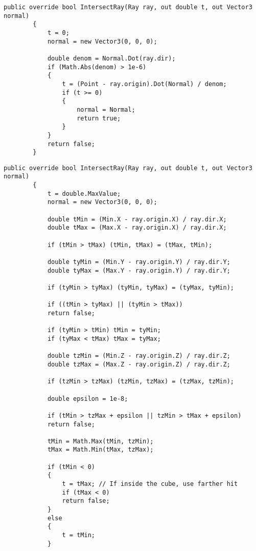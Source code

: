 \begin{center}
	\begin{lstlisting}[label={lst:WallIntersection}, captionpos={b}, caption={Алгоритм поиска точки пересечения луча с плоскостью (стеной)}]
		public override bool IntersectRay(Ray ray, out double t, out Vector3 normal)
		{
			t = 0;
			normal = new Vector3(0, 0, 0);
			
			double denom = Normal.Dot(ray.dir);
			if (Math.Abs(denom) > 1e-6)
			{
				t = (Point - ray.origin).Dot(Normal) / denom;
				if (t >= 0)
				{
					normal = Normal;
					return true;
				}
			}
			return false;
		}
	\end{lstlisting}
\end{center}

\begin{center}
	\begin{lstlisting}[label={lst:WallIntersection}, captionpos={b}, caption={Алгоритм поиска точки пересечения луча с кубом}]
		public override bool IntersectRay(Ray ray, out double t, out Vector3 normal)
		{
			t = double.MaxValue;
			normal = new Vector3(0, 0, 0);
			
			double tMin = (Min.X - ray.origin.X) / ray.dir.X;
			double tMax = (Max.X - ray.origin.X) / ray.dir.X;
			
			if (tMin > tMax) (tMin, tMax) = (tMax, tMin);
			
			double tyMin = (Min.Y - ray.origin.Y) / ray.dir.Y;
			double tyMax = (Max.Y - ray.origin.Y) / ray.dir.Y;
			
			if (tyMin > tyMax) (tyMin, tyMax) = (tyMax, tyMin);
			
			if ((tMin > tyMax) || (tyMin > tMax))
			return false;
			
			if (tyMin > tMin) tMin = tyMin;
			if (tyMax < tMax) tMax = tyMax;
			
			double tzMin = (Min.Z - ray.origin.Z) / ray.dir.Z;
			double tzMax = (Max.Z - ray.origin.Z) / ray.dir.Z;
			
			if (tzMin > tzMax) (tzMin, tzMax) = (tzMax, tzMin);
			
			double epsilon = 1e-8;
			
			if (tMin > tzMax + epsilon || tzMin > tMax + epsilon)
			return false;
			
			tMin = Math.Max(tMin, tzMin);
			tMax = Math.Min(tMax, tzMax);
			
			if (tMin < 0)
			{
				t = tMax; // If inside the cube, use farther hit
				if (tMax < 0) 
				return false;
			}
			else
			{
				t = tMin;
			}
			

\end{lstlisting}
\end{center}
